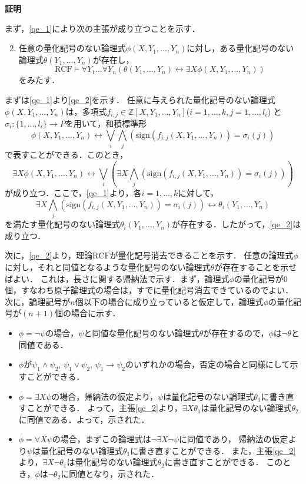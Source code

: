 \documentclass[uplatex, dvipdfmx]{jsarticle}
\makeatletter
\renewenvironment{proof}[1][\proofname]{\par
  \pushQED{\qed}%
  \normalfont \topsep6\p@\@plus6\p@\relax
  \trivlist
  \item\relax
  {\bfseries
  #1\@addpunct{.}}\hspace\labelsep\ignorespaces
}{%
  \popQED\endtrivlist\@endpefalse
}
\newcommand{\Z}{\mathbb{Z}}
\newcommand{\RCF}{\mathrm{RCF}}
\newcommand{\sign}{\mathrm{sign}}
\newcommand{\map}[3]{{#1}:{#2}\rightarrow{#3}}
\theoremstyle{definition}
\renewcommand{\proofname}{\textbf{証明}}
\makeatother
\begin{document}
\begin{proof}
     まず，\ref{qe_1}により次の主張が成り立つことを示す．
     \begin{enumerate}
          \setcounter{enumi}{1}
          \item \label{qe_2}
          任意の量化記号のない論理式$\phi(X, Y_1, \dots, Y_n)$に対し，ある量化記号のない論理式$\theta(Y_1, \dots, Y_n)$が存在し，
          \[
               \RCF \models \forall Y_1 \dots \forall Y_n(\theta(Y_1, \dots, Y_n) \leftrightarrow \exists X \phi(X, Y_1, \dots, Y_n))
          \]
          をみたす．
     \end{enumerate}

     まずは\ref{qe_1}より\ref{qe_2}を示す．
     任意に与えられた量化記号のない論理式$\phi(X, Y_1, \dots, Y_n)$は，多項式$f_{i,j} \in \Z[X, Y_1, \dots, Y_n]$($i=1, \dots, k, j=1, \dots, l_i$)
     と$\map{\sigma_i}{\{1, \dots, l_i\}}{P}$を用いて，和積標準形
     \[
          \phi(X, Y_1, \dots, Y_n) \leftrightarrow \bigvee_i \bigwedge_j (\sign(f_{i,j}(X, Y_1, \dots, Y_n)) = \sigma_i(j))
     \]
     で表すことができる．このとき，
     \[
          \exists X \phi(X, Y_1, \dots, Y_n) \leftrightarrow \bigvee_i (\exists X \bigwedge_j (\sign(f_{i,j}(X, Y_1, \dots, Y_n)) = \sigma_i(j)))
     \]
     が成り立つ．ここで，\ref{qe_1}より，各$i=1, \dots, k$に対して，
     \[
          \exists X \bigwedge_j (\sign(f_{i,j}(X, Y_1, \dots, Y_n)) = \sigma_i(j)) \leftrightarrow \theta_i(Y_1, \dots, Y_n)
     \]
     を満たす量化記号のない論理式$\theta_i(Y_1, \dots, Y_n)$が存在する．したがって，\ref{qe_2}は成り立つ．

     次に，\ref{qe_2}より，理論$\RCF$が量化記号消去できることを示す．
     任意の論理式$\phi$に対し，それと同値となるような量化記号のない論理式$\theta$が存在することを示せばよい．
     これは，長さに関する帰納法で示す．まず，論理式$\phi$の量化記号が0個，すなわち原子論理式の場合は，すでに量化記号消去できているのでよい．
     次に，論理記号が$n$個以下の場合に成り立っていると仮定して，論理式$\phi$の量化記号が$(n+1)$個の場合に示す．

     \begin{itemize}
          \item $\phi = \lnot \psi$の場合，$\psi$と同値な量化記号のない論理式$\theta$が存在するので，$\phi$は$\lnot \theta$と同値である．
          \item $\phi$が$\psi_1 \land \psi_2$, $\psi_1 \lor \psi_2$, $\psi_1 \rightarrow \psi_2$のいずれかの場合，否定の場合と同様にして示すことができる．
          \item $\phi = \exists X \psi$の場合，帰納法の仮定より，$\psi$は量化記号のない論理式$\theta_1$に書き直すことができる．
          よって，主張\ref{qe_2}より，$\exists X \theta_1$は量化記号のない論理式$\theta_2$に同値である．よって，示された．
          \item $\phi = \forall X \psi$の場合，まずこの論理式は$\lnot \exists X \lnot \psi$に同値であり，
          帰納法の仮定より$\psi$は量化記号のない論理式$\theta_1$に書き直すことができる．
          また，主張\ref{qe_2}より，$\exists X \lnot \theta_1$は量化記号のない論理式$\theta_2$に書き直すことができる．
          このとき，$\phi$は$\lnot \theta_2$に同値となり，示された．
     \end{itemize}     


\end{proof}
\end{document}
